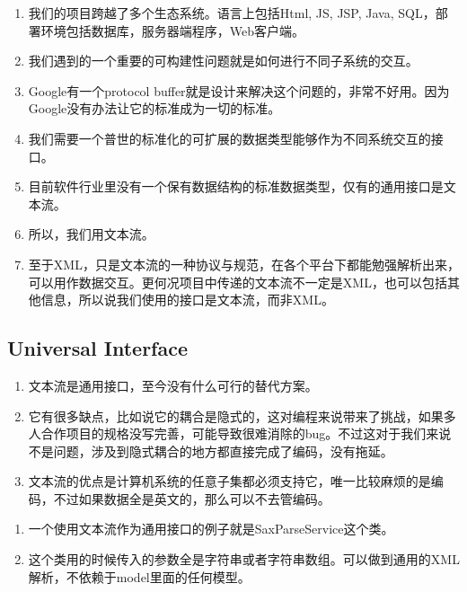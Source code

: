 ﻿\documentclass{beamer}
\begin{document}
\begin{frame}
  \begin{enumerate}
  \item
    我们的项目跨越了多个生态系统。语言上包括Html, JS, JSP, Java, SQL，部署环境包括数据库，服务器端程序，Web客户端。
    \pause
  \item
    我们遇到的一个重要的可构建性问题就是如何进行不同子系统的交互。
    \pause
  \item
    Google有一个protocol buffer就是设计来解决这个问题的，非常不好用。因为Google没有办法让它的标准成为一切的标准。
    \pause
  \item 我们需要一个普世的标准化的可扩展的数据类型能够作为不同系统交互的接口。\pause
  \item 目前软件行业里没有一个保有数据结构的标准数据类型，仅有的通用接口是文本流。\pause
  \item 所以，我们用文本流。\pause
  \item 至于XML，只是文本流的一种协议与规范，在各个平台下都能勉强解析出来，可以用作数据交互。更何况项目中传递的文本流不一定是XML，也可以包括其他信息，所以说我们使用的接口是文本流，而非XML。
  \end{enumerate}
\end{frame}


\subsection{Universal Interface}
\begin{frame}
 \begin{enumerate}
   \item 文本流是通用接口，至今没有什么可行的替代方案。\pause
\item 它有很多缺点，比如说它的耦合是隐式的，这对编程来说带来了挑战，如果多人合作项目的规格没写完善，可能导致很难消除的bug。不过这对于我们来说不是问题，涉及到隐式耦合的地方都直接完成了编码，没有拖延。\pause
\item 文本流的优点是计算机系统的任意子集都必须支持它，唯一比较麻烦的是编码，不过如果数据全是英文的，那么可以不去管编码。\pause
 \end{enumerate}
\end{frame}  
\begin{frame}
 \begin{enumerate}
 \item 一个使用文本流作为通用接口的例子就是SaxParseService这个类。
 \item 这个类用的时候传入的参数全是字符串或者字符串数组。可以做到通用的XML解析，不依赖于model里面的任何模型。
 \end{enumerate}
\end{frame}  
\end{document}
